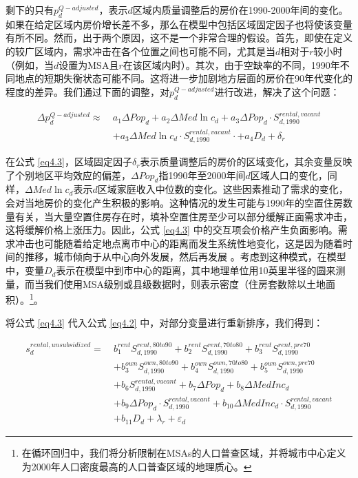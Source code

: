 \documentclass[lang=cn,11pt,a4paper]{paper}
\begin{document}
剩下的只有$p_{d}^{Q-adjusted}$，表示$d$区域内质量调整后的房价在1990-2000年间的变化。如果在给定区域内房价增长差不多，那么在模型中包括区域固定因子也将使该变量有所不同。然而，出于两个原因，这不是一个非常合理的假设。首先，即使在定义的较广区域内，需求冲击在各个位置之间也可能不同，尤其是当$d$相对于$r$较小时（例如，当$d$设置为MSA且$r$在该区域内时）。其次，由于空缺率的不同，1990年不同地点的短期失衡状态可能不同。这将进一步加剧地方层面的房价在90年代变化的程度的差异。我们通过下面的调整，对$p_{d}^{Q-adjusted}$进行改进，解决了这个问题：

\begin{equation}\label{eq4.3}
  \begin{aligned}
    \Delta p_{d}^{Q-adjusted} \approx \ & a_{1} \Delta Pop_{d}+a_{2} \Delta Med \ln c_{d}+a_{3} \Delta P o p_{d} \cdot S_{d, 1990}^{rental,vacant} \\
    &+a_{3} \Delta M e d \ln c_{d} \cdot S_{d, 1990}^{rental,vacant} \cdot+a_{4} D_{d}+\delta_{r}
    \end{aligned}
\end{equation}
\vspace{2pt}

在公式 \eqref{eq4.3}，区域固定因子$\delta_{r}$表示质量调整后的房价的区域变化，其余变量反映了个别地区平均效应的偏差，$\Delta Pop_{d}$指1990年至2000年间$d$区域人口的变化，同样，$\Delta Med \ln c_{d}$表示$d$区域家庭收入中位数的变化。这些因素推动了需求的变化，会对当地房价的变化产生积极的影响。这种情况的发生可能与1990年的空置住房数量有关，当大量空置住房存在时，填补空置住房至少可以部分缓解正面需求冲击，这将缓解价格上涨压力。因此，公式 \eqref{eq4.3} 中的交互项会价格产生负面影响。需求冲击也可能随着给定地点离市中心的距离而发生系统性地变化，这是因为随着时间的推移，城市倾向于从中心向外发展，然后再发展 \cite{Brueckner2009725}。考虑到这种模式，在模型中，变量$D_d$表示在模型中到市中心的距离，其中地理单位用10英里半径的圆来测量，而当我们使用MSA级别或县级数据时，则表示密度（住房套数除以土地面积）。\!\footnote{在循环回归中，我们将分析限制在MSAs的人口普查区域，并将城市中心定义为2000年人口密度最高的人口普查区域的地理质心。}。

将公式 \eqref{eq4.3} 代入公式 \eqref{eq4.2} 中，对部分变量进行重新排序，我们得到：

\begin{equation}\label{eq4.4}
  \begin{aligned}
    s_{d}^{rental, unsubsidized}=\ & b_{1}^{rent} S_{d, 1990}^{rent, 80 t o 90}+b_{2}^{rent} S_{d, 1990}^{rent, 70 t o 80}+b_{3}^{rent} S_{d, 1990}^{rent, p r e 70} \\
    &+b_{3}^{own} S_{d, 1990}^{own, 80 t o 90}+b_{4}^{own} S_{d, 1990}^{own, 70 t o 80}+b_{5}^{own} S_{d, 1990}^{own, p r e 70} \\
    &+b_{6} S_{d, 1990}^{rent a l, vacant}+b_{7} \Delta P o p_{d}+b_{8} \Delta MedInc_{d} \\
    &+b_{9} \Delta Po p_{d} \cdot S_{d, 1990}^{rental, vacant}+b_{10} \Delta MedInc_{d} \cdot S_{d, 1990}^{rent a l, vacant} \\
    &+b_{11} D_{d}+\lambda_{r}+\varepsilon_{d}
    \end{aligned}
\end{equation}
\vspace{2pt}
\end{document}
